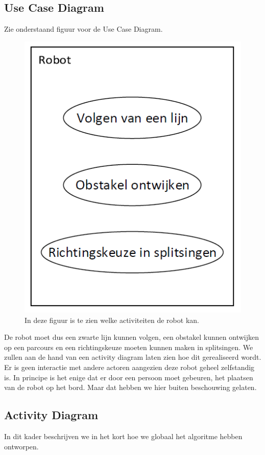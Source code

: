 \documentclass[12pt]{article}
\begin{document}
		\subsection{Use Case Diagram}
			Zie onderstaand figuur voor de Use Case Diagram.
		\begin{center}
			\begin{figure}
				\includegraphics[scale=.7]{UseCase}
				\caption{In deze figuur is te zien welke activiteiten de robot kan.}
			\end{figure}
		\end{center}
		De robot moet dus een zwarte lijn kunnen volgen, een obstakel kunnen ontwijken op een parcours en een richtingskeuze moeten kunnen maken in splitsingen. We zullen aan de hand van een activity diagram laten zien hoe dit gerealiseerd wordt. \\Er is geen interactie met andere actoren aangezien deze robot geheel zelfstandig is. In principe is het enige dat er door een persoon moet gebeuren, het plaatsen van de robot op het bord. Maar dat hebben we hier buiten beschouwing gelaten.
	\subsection{Activity Diagram}
		In dit kader beschrijven we in het kort hoe we globaal het algoritme hebben ontworpen.
\newpage
\end{document}
